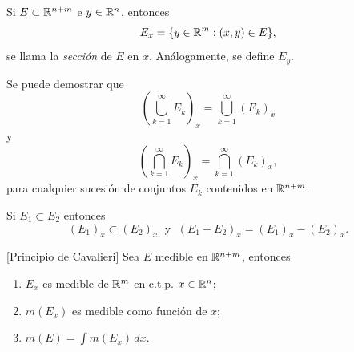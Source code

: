         Si $E\subset \mathbb{R}^{n+m}$ e $y\in \mathbb{R}^n$, entonces
        \[
        E_x=\{y \in \mathbb{R}^m: (x,y)\in E\},
        \]
        se llama la \emph{secci\'on} de $E$ en $x$.
                An\'alogamente, se define $E_y$.
        
        Se puede demostrar que 
        \[
        \left(\bigcup\limits_{k=1}^{\infty} E_k \right)_x
        = \bigcup\limits_{k=1}^{\infty} \left(E_k\right)_x\]
        y
        \[
        \left(\bigcap\limits_{k=1}^{\infty} E_k \right)_x
        = \bigcap\limits_{k=1}^{\infty} \left(E_k\right)_x,\]
        para cualquier sucesi\'on de conjuntos $E_k$ contenidos en $\mathbb{R}^{n+m}$. 
        
        Si $E_1\subset E_2$ entonces 
        \[
        \left(E_1\right)_x  \subset   \left(E_2\right)_x   
       \; \mbox{ y }\;
        \left(E_1-E_2\right)_x=\left(E_1\right)_x -\left(E_2\right)_x.
        \]
        
        \begin{teorema}{}[Principio de Cavalieri]
        Sea $E$ medible en $\mathbb{R}^{n+m}$, entonces
        \begin{enumerate}
            \item $E_x$ es medible de $\mathbb{R}^{m}$ en c.t.p. $x \in \mathbb{R}^n$;
            \item $m\left(E_x\right)$ es medible como funci\'on de $x$;
            \item $m(E)=\int m\left(E_x\right)\, dx$.
        \end{enumerate}
        \end{teorema}
        
